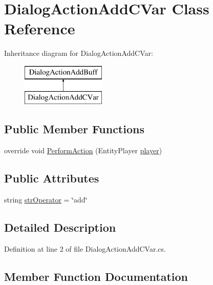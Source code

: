 \hypertarget{class_dialog_action_add_c_var}{}\section{Dialog\+Action\+Add\+C\+Var Class Reference}
\label{class_dialog_action_add_c_var}
Inheritance diagram for Dialog\+Action\+Add\+C\+Var\+:\begin{figure}[H]
\begin{center}
\leavevmode
\includegraphics[height=2.000000cm]{class_dialog_action_add_c_var}
\end{center}
\end{figure}
\subsection*{Public Member Functions}
\begin{DoxyCompactItemize}
\item 
override void \mbox{\hyperlink{class_dialog_action_add_c_var_a9b0afc913342c5e38f7a33a22bca54ed}{Perform\+Action}} (Entity\+Player \mbox{\hyperlink{_sphere_i_i_01_music_01_boxes_2_config_2_localization_8txt_a4e2cb8aeff651600ea1cc57fe5a929a4}{player}})
\end{DoxyCompactItemize}
\subsection*{Public Attributes}
\begin{DoxyCompactItemize}
\item 
string \mbox{\hyperlink{class_dialog_action_add_c_var_a7f9165f525e4976db76ef899772a0bf9}{str\+Operator}} = \char`\"{}add\char`\"{}
\end{DoxyCompactItemize}


\subsection{Detailed Description}


Definition at line 2 of file Dialog\+Action\+Add\+C\+Var.\+cs.



\subsection{Member Function Documentation}
\mbox{\label{class_dialog_action_add_c_var_a9b0afc913342c5e38f7a33a22bca54ed}} 
